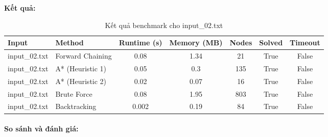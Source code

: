 \textbf{Kết quả:}
\begin{table}[H]
\centering
\begin{tabular}{|l|l|c|c|c|c|c|}
\hline
\textbf{Input} & \textbf{Method} & \textbf{Runtime (s)} & \textbf{Memory (MB)} & \textbf{Nodes} & \textbf{Solved} & \textbf{Timeout} \\
\hline
input\_02.txt & Forward Chaining & 0.08 & 1.34 & 21 & True & False \\
input\_02.txt & A* (Heuristic 1) & 0.05 & 0.3 & 135 & True & False \\
input\_02.txt & A* (Heuristic 2) & 0.02 & 0.07 & 16 & True & False \\
input\_02.txt & Brute Force & 0.08 & 1.95 & 803 & True & False \\
input\_02.txt & Backtracking & 0.002 & 0.19 & 84 & True & False \\
\hline
\end{tabular}
\caption{Kết quả benchmark cho input\_02.txt}
\end{table}

\paragraph{So sánh và đánh giá:}


